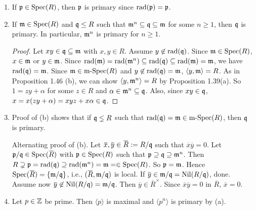 \begin{example}
    \begin{enumerate}
        \item 
            If $\mathfrak{p} \in \operatorname{Spec}(R)$, then $\mathfrak{p}$ is primary since $\operatorname{rad}(\mathfrak{p}) = \mathfrak{p}$.
        \item 
            If $\mathfrak{m} \in \operatorname{Spec}(R)$ and $\mathfrak{q} \leq R$ such that $\mathfrak{m}^{n} \subseteq \mathfrak{q} \subseteq \mathfrak{m}$ for some $n \geq 1$, then $\mathfrak{q}$ is primary. In particular, $\mathfrak{m}^{n}$ is primary for $n \geq 1$.
            \begin{proof}
                Let $xy \in \mathfrak{q} \subseteq \mathfrak{m}$ with $x,y \in R$. Assume $y \not\in \operatorname{rad}(\mathfrak{q})$. Since $\mathfrak{m} \in \operatorname{Spec}(R)$, $x \in \mathfrak{m}$ or $y \in \mathfrak{m}$. Since $\operatorname{rad}(\mathfrak{m}) = \operatorname{rad}(\mathfrak{m}^{n}) \subseteq \operatorname{rad}(\mathfrak{q}) \subseteq \operatorname{rad}(\mathfrak{m}) = \mathfrak{m}$, we have $\operatorname{rad}(\mathfrak{q}) = \mathfrak{m}$. Since $\mathfrak{m} \in \operatorname{m-Spec}(R)$ and $y \not \in \operatorname{rad}(\mathfrak{q}) = \mathfrak{m}$, $\langle y,\mathfrak{m} \rangle = R$. As in Proposition 1.46 (b), we can show $\langle y,\mathfrak{m}^{n} \rangle = R$ by Proposition 1.39(a). So $1 = zy + \alpha$ for some $z \in R$ and $\alpha \in \mathfrak{m}^{n} \subseteq \mathfrak{q}$. Also, since $xy \in \mathfrak{q}$, $x = x(zy+\alpha) = xyz+x\alpha \in \mathfrak{q}$. 
            \end{proof}
        \item 
            Proof of (b) shows that if $\mathfrak{q} \lneq R$ such that $\operatorname{rad}(\mathfrak{q}) = \mathfrak{m} \in \operatorname{m-Spec}(R)$, then $\mathfrak{q}$ is primary. \par 
            Alternating proof of (b). Let $\overbar{x},\overbar{y} \in \overbar{R}: = R/\ffq$ such that $\overbar{x} \overbar{y} = 0$. Let $\ffp/\ffq \in \operatorname{Spec}(\overbar{R})$ with $\mathfrak{p} \in \operatorname{Spec}(R)$ such that $\mathfrak{p} \supseteq \mathfrak{q} \supseteq \mathfrak{m}^{n}$. Then $R \supsetneq \mathfrak{p} = \operatorname{rad}(\mathfrak{q}) \supseteq \operatorname{rad}(\mathfrak{m}^{n}) = \mathfrak{m} = \in \operatorname{Spec}(R)$. So $\mathfrak{p} = \mathfrak{m}$. Hence $\operatorname{Spec}(\overbar{R}) = \{\ffm/\ffq\}$, i.e., $(\overbar{R},\ffm/\ffq)$ is local. If $\overbar{y} \in \ffm/\ffq = \operatorname{Nil}(R/\ffq)$, done. Assume now $\overbar{y} \not \in \operatorname{Nil}(R/\ffq) = \ffm/\ffq$. Then $\overbar{y} \in \overbar{R}^{\times}$. Since $\overbar{x} \overbar{y} = 0$ in $\overbar{R}$, $\overbar{x} = 0$.
        \item Let $p \in \mathbb{Z}$ be prime. Then $\langle p \rangle$ is maximal and $\langle p^{n} \rangle$ is primary by (a).
    \end{enumerate}
\end{example}

